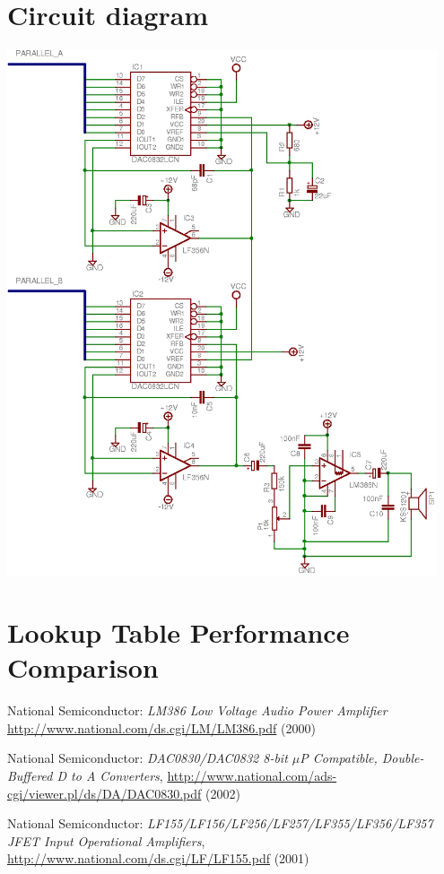 \documentclass[10pt,twoside,openright]{report}
\newenvironment{nowordcount}{}{}
\begin{document}
\begin{nowordcount}

\chapter{Circuit diagram}
\begin{center}
\label{appendix:circuit-diagram}
\includegraphics[width=0.95\textwidth]{images/output-schematic}
\end{center}

\chapter{Lookup Table Performance Comparison}
\label{appendix:lookup-table-comparison}


\pagebreak
\begin{thebibliography}{99}

National Semiconductor:
\emph{LM386 Low Voltage Audio Power Amplifier}
\url{http://www.national.com/ds.cgi/LM/LM386.pdf} (2000)

National Semiconductor:
\emph{DAC0830/DAC0832 8-bit $\mu$P Compatible, Double-Buffered D to A Converters}, 
\url{http://www.national.com/ads-cgi/viewer.pl/ds/DA/DAC0830.pdf} (2002)

National Semiconductor:
\emph{LF155/LF156/LF256/LF257/LF355/LF356/LF357 JFET Input Operational Amplifiers},
\url{http://www.national.com/ds.cgi/LF/LF155.pdf} (2001)
\end{thebibliography}

\end{nowordcount}
\end{document}
